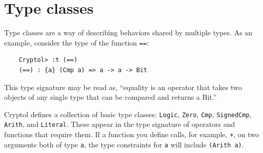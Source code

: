 \section{Type classes}\indTypeClasses
\label{sec:type-classes}



Type classes are a way of describing behaviors shared by multiple
types.  As an example, consider the type of the function {\tt ==}:
\begin{Verbatim}
    Cryptol> :t (==)
    (==) : {a} (Cmp a) => a -> a -> Bit
\end{Verbatim}

This type signature may be read as, ``equality is an operator that
takes two objects of any single type that can be compared and returns
a Bit.''

Cryptol defines a collection of basic type classes: \texttt{Logic},
\texttt{Zero}, \texttt{Cmp}, \texttt{SignedCmp}, \texttt{Arith}, and
\texttt{Literal}. These appear in the type signature of operators and
functions that require them. If a function you define calls, for
example, \texttt{+}, on two arguments both of type \texttt{a}, the
type constraints for \texttt{a} will include \texttt{(Arith a)}.


